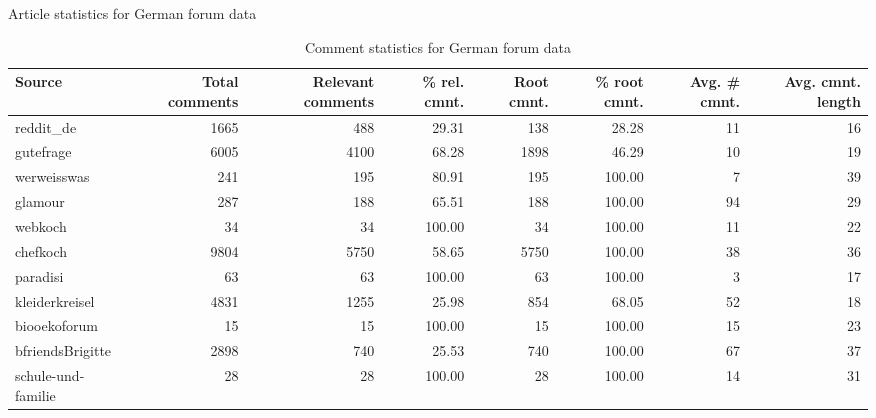 \begin{table}
	\caption{Article statistics for German forum data} 
	\begin{tabular}{lrrrrrrr}
		\toprule
		Source             & Total comments & Relevant comments & \% rel. cmnt. & Root cmnt. & \% root cmnt. & Avg. \# cmnt. & Avg. cmnt. length\footnotemark[1] \\ \midrule
		reddit\_de         &           1665 &               488 &         29.31 &        138 &         28.28 &            11 &                16 \\
		gutefrage          &           6005 &              4100 &         68.28 &       1898 &         46.29 &            10 &                19 \\
		werweisswas        &            241 &               195 &         80.91 &        195 &        100.00 &             7 &                39 \\
		glamour            &            287 &               188 &         65.51 &        188 &        100.00 &            94 &                29 \\
		webkoch            &             34 &                34 &        100.00 &         34 &        100.00 &            11 &                22 \\
		chefkoch           &           9804 &              5750 &         58.65 &       5750 &        100.00 &            38 &                36 \\
		paradisi           &             63 &                63 &        100.00 &         63 &        100.00 &             3 &                17 \\
		kleiderkreisel     &           4831 &              1255 &         25.98 &        854 &         68.05 &            52 &                18 \\
		biooekoforum       &             15 &                15 &        100.00 &         15 &        100.00 &            15 &                23 \\
		bfriendsBrigitte   &           2898 &               740 &         25.53 &        740 &        100.00 &            67 &                37 \\
		schule-und-familie &             28 &                28 &        100.00 &         28 &        100.00 &            14 &                31 \\ \bottomrule
	\end{tabular}	
	\caption{Comment statistics for German forum data} 
\end{table}
